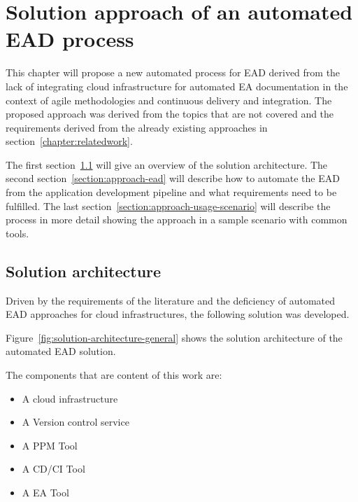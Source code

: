\chapter{Solution approach of an automated EAD process}\label{chapter:approach}

This chapter will propose a new automated process for EAD derived from the lack of integrating cloud infrastructure for automated EA documentation in the context of agile methodologies and continuous delivery and integration. The proposed approach was derived from the topics that are not covered and the requirements derived from the already existing approaches in section~\ref{chapter:relatedwork}.

The first section~\ref{section:solution-architecture} will give an overview of the solution architecture. The second section~\ref{section:approach-ead} will describe how to automate the EAD from the application development pipeline and what requirements need to be fulfilled. The last section~\ref{section:approach-usage-scenario} will describe the process in more detail showing the approach in a sample scenario with common tools.

\section{Solution architecture}\label{section:solution-architecture}

Driven by the requirements of the literature and the deficiency of automated EAD approaches for cloud infrastructures, the following solution was developed.

Figure~\ref{fig:solution-architecture-general} shows the solution architecture of the automated EAD solution. 

The components that are content of this work are:
\begin{itemize}
    \item A cloud infrastructure
    \item A Version control service
    \item A PPM Tool
    \item A CD/CI Tool
    \item A EA Tool
\end{itemize}


